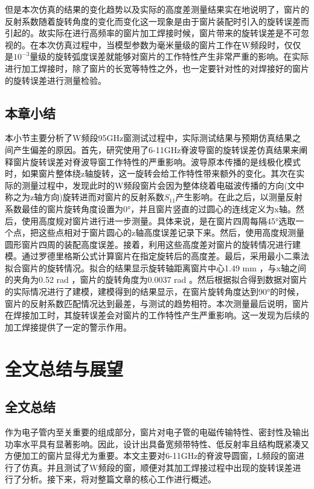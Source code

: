 \documentclass[master]{thesis-uestc}
\begin{document}
但是本次仿真的结果的变化趋势以及实际的高度差测量结果实在地说明了，窗片的反射系数随着旋转角度的变化而变化这一现象是由于窗片装配时引入的旋转误差而引起的。故实际在进行高频率的窗片加工焊接时候，窗片带来的旋转误差是不可忽视的。在本次仿真过程中，当模型参数为毫米量级的窗片工作在W频段时，仅仅是\(10^{-3}\)量级的旋转弧度误差就能够对窗片的工作特性产生非常严重的影响。在实际进行加工焊接时，除了窗片的长宽等特性之外，也一定要针对性的对焊接好的窗片的旋转误差进行测量检验。

\section{本章小结}
本小节主要分析了W频段95GHz窗测试过程中，实际测试结果与预期仿真结果之间产生偏差的原因。首先，研究使用了6-11GHz脊波导窗的旋转误差仿真结果来阐释窗片旋转误差对脊波导窗工作特性的严重影响。波导原本传播的是线极化模式时，如果窗片整体绕z轴旋转，这一旋转会给工作特性带来额外的变化。其次在实际的测量过程中，发现此时的W频段窗片会因为整体绕着电磁波传播的方向(文中称之为z轴方向)旋转进而对窗片的反射系数\(S_{11}\)产生影响。在此之后，以测量反射系数最佳的窗片旋转角度设置为0°，并且窗片竖直的过圆心的连线定义为x轴。然后，使用高度规对窗片进行进一步测量。具体来说，是在窗片四周每隔45°选取一个点，把这些点相对于窗片圆心的z轴高度误差记录下来。然后，使用高度规测量圆形窗片四周的装配高度误差。接着，利用这些高度差对窗片的旋转情况进行建模。通过罗德里格斯公式计算窗片在指定旋转后的高度差。最后，采用最小二乘法拟合窗片的旋转情况。拟合的结果显示旋转轴距离窗片中心1.49 mm ，与x轴之间的夹角为0.52 rad ，窗片的旋转角度为0.0037 rad 。然后根据拟合得到数据对窗片的实际情况进行了建模，建模得到的结果显示，在窗片旋转角度达到90°的时候，窗片的反射系数匹配情况达到最差，与测试的趋势相符。本次测量最后说明，窗片在焊接加工时，其旋转误差会对窗片的工作特性产生严重影响。这一发现为后续的加工焊接提供了一定的警示作用。

\chapter{全文总结与展望}

\section{全文总结}
作为电子管内至关重要的组成部分，窗片对电子管的电磁传输特性、密封性及输出功率水平具有显著影响。因此，设计出具备宽频带特性、低反射率且结构既紧凑又方便加工的窗片显得尤为重要。本文主要对6-11GHz的脊波导圆窗，L频段的窗进行了仿真。并且测试了W频段的窗，顺便对其加工焊接过程中出现的旋转误差进行了分析。接下来，将对整篇文章的核心工作进行概述。
\end{document}
